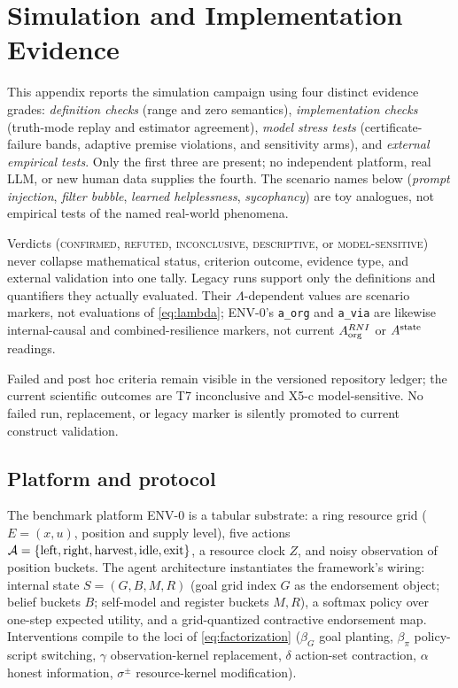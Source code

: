 \section{Simulation and Implementation Evidence}\label{sec:experiments}

This appendix reports the simulation campaign using four distinct evidence
grades: \emph{definition checks} (range and zero semantics),
\emph{implementation checks} (truth-mode replay and estimator agreement),
\emph{model stress tests} (certificate-failure bands, adaptive premise violations, and
sensitivity arms), and \emph{external empirical tests}. Only the first three
are present; no independent platform, real LLM, or new human data supplies
the fourth. The scenario names below (\emph{prompt injection}, \emph{filter
bubble}, \emph{learned helplessness}, \emph{sycophancy}) are toy analogues,
not empirical tests of the named real-world phenomena.

Verdicts (\textsc{confirmed}, \textsc{refuted}, \textsc{inconclusive},
\textsc{descriptive}, or \textsc{model-sensitive}) never collapse mathematical
status, criterion outcome, evidence type, and external validation into one
tally. Legacy runs support only the definitions and quantifiers they actually
evaluated. Their $\Lambda$-dependent values are scenario markers, not
evaluations of \eqref{eq:lambda}; ENV-0's \texttt{a\_org} and \texttt{a\_via}
are likewise internal-causal and combined-resilience markers, not current
$A_{\mathrm{org}}^{RNI}$ or $A^{\mathrm{state}}$ readings.

Failed and post hoc criteria remain visible in the versioned repository ledger;
the current scientific outcomes are T7 inconclusive and X5-c model-sensitive.
No failed run, replacement, or legacy marker is silently promoted to current
construct validation.

\subsection{Platform and protocol}

The benchmark platform ENV-0 is a tabular substrate: a ring resource grid
($E=(x,u)$, position and supply level), five actions
$\mathcal{A}=\{\text{left},\text{right},\text{harvest},\text{idle},\text{exit}\}$, a
resource clock $Z$, and noisy observation of position buckets. The agent
architecture instantiates the framework's wiring: internal state
$S=(G,B,M,R)$ (goal grid index $G$ as the endorsement object; belief buckets
$B$; self-model and register buckets $M,R$), a softmax policy over one-step
expected utility, and a grid-quantized contractive endorsement map.
Interventions compile to the loci of \eqref{eq:factorization} ($\beta_G$
goal planting, $\beta_\pi$ policy-script switching, $\gamma$
observation-kernel replacement, $\delta$ action-set contraction, $\alpha$
honest information, $\sigma^{\pm}$ resource-kernel modification).


